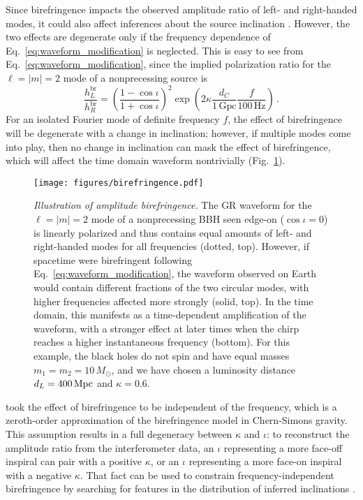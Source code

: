 \documentclass[aps,prd,twocolumn,superscriptaddress,preprintnumbers,floatfix,nofootinbib]{revtex4-2}
\begin{document}
Since birefringence impacts the observed amplitude ratio of left- and right-handed modes, it could also affect inferences about the source inclination \cite{Alexander:2009tp}.
However, the two effects are degenerate only if the frequency dependence of Eq.~\eqref{eq:waveform_modification} is neglected.
This is easy to see from Eq.~\eqref{eq:waveform_modification}, since the implied polarization ratio for the $\ell = |m| = 2$ mode of a nonprecessing source is
\begin{equation}
    \frac{h_{L}^\mathrm{br}}{h_{R}^\mathrm{br}}=\left(\frac{1-\cos\iota}{1+\cos\iota}\right)^2
    \exp\left({2\kappa\frac{d_C}{1\, \mathrm{Gpc}}\frac{f}{100\, \mathrm{Hz}}}\right)\, .
    \label{eq:modified_amplitude_ratio}
\end{equation}
For an isolated Fourier mode of definite frequency $f$, the effect of birefringence will be degenerate with a change in inclination; however, if multiple modes come into play, then no change in inclination can mask the effect of birefringence, which will affect the time domain waveform nontrivially (Fig.~\ref{fig:birefringence}).

\begin{figure}
    \texttt{[image: figures/birefringence.pdf]}
    \caption{
        \emph{Illustration of amplitude birefringence.} The GR waveform for the $\ell=|m|=2$ mode of a nonprecessing BBH seen edge-on ($\cos\iota = 0$) is linearly polarized and thus contains equal amounts of left- and right-handed modes for all frequencies (dotted, top).
        However, if spacetime were birefringent following Eq.~\protect\eqref{eq:waveform_modification}, the waveform observed on Earth would contain different fractions of the two circular modes, with higher frequencies affected more strongly (solid, top). 
        In the time domain, this manifests as a time-dependent amplification of the waveform, with a stronger effect at later times when the chirp reaches a higher instantaneous frequency (bottom).
        For this example, the black holes do not spin and have equal masses $m_1 = m_2 = 10\, M_\odot$, and we have chosen a luminosity distance $d_L = 400\, {\rm Mpc}$ and $\kappa = 0.6$.
        }
    \label{fig:birefringence}
\end{figure}

\citet{Okounkova_2022} took the effect of birefringence to be independent of the frequency, which is a zeroth-order approximation of the birefringence model in Chern-Simons gravity.
This assumption results in a full degeneracy between $\kappa$ and $\iota$:
to reconstruct the amplitude ratio from the interferometer data, an $\iota$ representing a more face-off inspiral can pair with a positive $\kappa$, or an $\iota$ representing a more face-on inspiral with a negative $\kappa$.
That fact can be used to constrain frequency-independent birefringence by searching for features in the distribution of inferred inclinations \cite{Okounkova_2022}.
\end{document}
